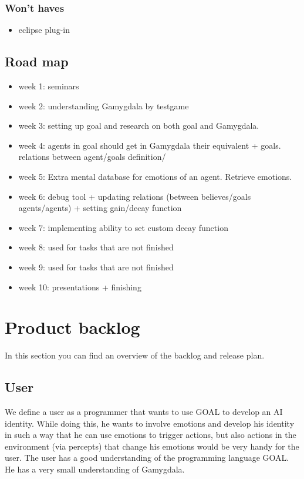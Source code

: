 \documentclass[]{article}
\begin{document}
\subsubsection*{Won't haves}
\begin{itemize}
	\item eclipse plug-in
\end{itemize}

\subsection{Road map}
\begin{itemize}
	\item week 1: seminars
	\item week 2: understanding Gamygdala by testgame
	\item week 3: setting up goal and research on both goal and Gamygdala.
	\item week 4: agents in goal should get in Gamygdala their equivalent + goals. relations between agent/goals definition/
	\item week 5:  Extra mental database for emotions of an agent. Retrieve emotions.
	\item week 6: debug tool + updating relations (between believes/goals agents/agents) + setting gain/decay function
	\item week 7: implementing ability to set custom decay function
	\item week 8: used for tasks that are not finished
	\item week 9: used for tasks that are not finished
	\item week 10: presentations + finishing
	
\end{itemize}

\section{Product backlog}
In this section you can find an overview of the backlog and release plan.
\subsection{User}
We define a user as a programmer that wants to use GOAL to develop an AI identity. While doing this, he wants to involve emotions and develop his identity in such a way that he can use emotions to trigger actions, but also actions in the environment (via percepts) that change his emotions would be very handy for the user. The user has a good understanding of the programming language GOAL. He has a very small understanding of Gamygdala.
\end{document}

